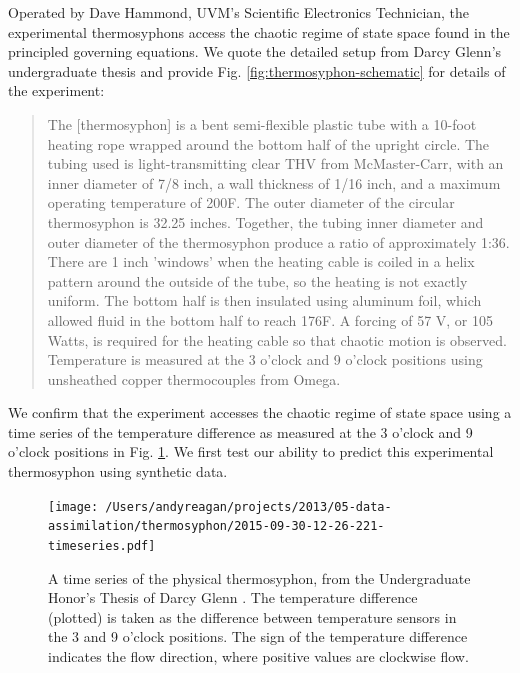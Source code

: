Operated by Dave Hammond, UVM's Scientific Electronics Technician, the experimental thermosyphons access the chaotic regime of state space found in the principled governing equations.
We quote the detailed setup from Darcy Glenn's undergraduate thesis \cite{glenn2013} and provide Fig. \ref{fig:thermosyphon-schematic} for details of the experiment:
\begin{quote}
The [thermosyphon] is a bent semi-flexible plastic tube with a 10-foot heating rope wrapped around the bottom half of the upright circle.
The tubing used is light-transmitting clear THV from McMaster-Carr, with an inner diameter of 7/8 inch, a wall thickness of 1/16 inch, and a maximum operating temperature of 200F.
The outer diameter of the circular thermosyphon is 32.25 inches.
Together, the tubing inner diameter and outer diameter of the thermosyphon produce a ratio of approximately 1:36.
There are 1 inch 'windows' when the heating cable is coiled in a helix pattern around the outside of the tube, so the heating is not exactly uniform.
The bottom half is then insulated using aluminum foil, which allowed fluid in the bottom half to reach 176F.
A forcing of 57 V, or 105 Watts, is required for the heating cable so that chaotic motion is observed.
Temperature is measured at the 3 o'clock and 9 o'clock positions using unsheathed copper thermocouples from Omega.
\end{quote}
We confirm that the experiment accesses the chaotic regime of state space using a time series of the temperature difference as measured at the 3 o'clock and 9 o'clock positions in Fig. \ref{fig:thermosyphon-physical-timeseries}.
We first test our ability to predict this experimental thermosyphon using synthetic data.

\begin{figure}[h]
  \centering
  \texttt{[image: /Users/andyreagan/projects/2013/05-data-assimilation/thermosyphon/2015-09-30-12-26-221-timeseries.pdf]}
  \caption[A time series of the physical thermosyphon, from the Undergraduate Honor's Thesis of Darcy Glenn {\protect \cite{glenn2013}}]{
    A time series of the physical thermosyphon, from the Undergraduate Honor's Thesis of Darcy Glenn {\protect \cite{glenn2013}}.
    The temperature difference (plotted) is taken as the difference between temperature sensors in the 3 and 9 o'clock positions.
    The sign of the temperature difference indicates the flow direction, where positive values are clockwise flow.
  }
  \label{fig:thermosyphon-physical-timeseries}
\end{figure}

